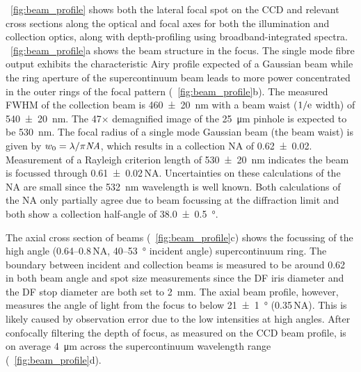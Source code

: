 \documentclass{article}
\begin{document}
\figurename~\ref{fig:beam_profile} shows both the lateral focal spot on the CCD and relevant cross sections along the optical and focal axes for both the illumination and collection optics, along with depth-profiling using broadband-integrated spectra. \figurename~\ref{fig:beam_profile}a shows the beam structure in the focus.  The single mode fibre output exhibits the characteristic Airy profile expected of a Gaussian beam while the ring aperture of the supercontinuum beam leads to more power concentrated in the outer rings of the focal pattern (\figurename~\ref{fig:beam_profile}b). The measured FWHM of the collection beam is \SI{460\pm20}{nm} with a beam waist ($1/\mathrm{e}$ width) of \SI{540\pm20}{nm}. The 47$\times$ demagnified image of the \SI{25}{\micro\metre} pinhole is expected to be \SI{530}{nm}. The focal radius of a single mode Gaussian beam  (the beam waist) is given by $w_0 = \lambda/\pi\mathit{NA}$, which results in a collection NA of \num{0.62\pm0.02}. Measurement of a Rayleigh criterion length of \SI{530\pm20}{nm} indicates the beam is focussed through \num{0.61\pm0.02}\,NA. Uncertainties on these calculations of the NA are small since the \SI{532}{nm} wavelength is well known. Both calculations of the NA only partially agree due to beam focussing at the diffraction limit and both show a collection half-angle of \SI{38.0\pm0.5}{\degree}.


The axial cross section of beams (\figurename~\ref{fig:beam_profile}c) shows the focussing of the high angle (0.64--0.8\,NA, 40--\SI{53}{\degree} incident angle) supercontinuum ring. The boundary between incident and collection beams is measured to be around 0.62 in both beam angle and spot size measurements since the DF iris diameter and the DF stop diameter are both set to \SI{2}{mm}. The axial beam profile, however, measures the angle of light from the focus to below \SI{21\pm1}{\degree} (0.35\,NA). This is likely caused by observation error due to the low intensities at high angles. After confocally filtering the depth of focus, as measured on the CCD beam profile, is on average \SI{4}{\micro\metre} across the supercontinuum wavelength range (\figurename~\ref{fig:beam_profile}d).
\end{document}
